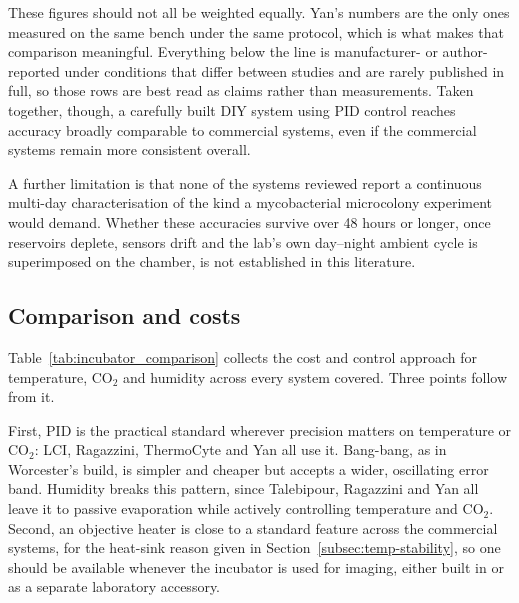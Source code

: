 These figures should not all be weighted equally. Yan's numbers are the only ones measured on the same bench under the same protocol, which is what makes that comparison meaningful. Everything below the line is manufacturer- or author-reported under conditions that differ between studies and are rarely published in full, so those rows are best read as claims rather than measurements. Taken together, though, a carefully built DIY system using PID control reaches accuracy broadly comparable to commercial systems, even if the commercial systems remain more consistent overall.

A further limitation is that none of the systems reviewed report a continuous multi-day characterisation of the kind a mycobacterial microcolony experiment would demand. Whether these accuracies survive over 48 hours or longer, once reservoirs deplete, sensors drift and the lab's own day--night ambient cycle is superimposed on the chamber, is not established in this literature.

\subsection{Comparison and costs}
\label{subsec:existing-comparison}

Table~\ref{tab:incubator_comparison} collects the cost and control approach for temperature, CO$_2$ and humidity across every system covered. Three points follow from it.

First, PID is the practical standard wherever precision matters on temperature or CO$_2$: LCI, Ragazzini, ThermoCyte and Yan all use it. Bang-bang, as in Worcester's build, is simpler and cheaper but accepts a wider, oscillating error band. Humidity breaks this pattern, since Talebipour, Ragazzini and Yan all leave it to passive evaporation while actively controlling temperature and CO$_2$. Second, an objective heater is close to a standard feature across the commercial systems, for the heat-sink reason given in Section~\ref{subsec:temp-stability}, so one should be available whenever the incubator is used for imaging, either built in or as a separate laboratory accessory.

